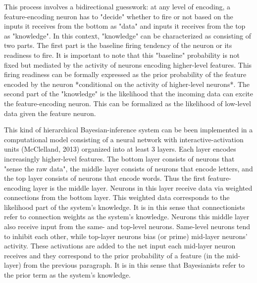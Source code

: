     This process involves a bidirectional guesswork: at any level of encoding, a feature-encoding neuron has to "decide" whether to fire or not based on the inputs it receives from the bottom as "data" and inputs it receives from the top as "knowledge". In this context, "knowledge" can be characterized as consisting of two parts. The first part is the baseline firing tendency of the neuron or its readiness to fire. It is important to note that this "baseline" probability is not fixed but mediated by the activity of neurons encoding higher-level features. This firing readiness can be formally expressed as the prior probability of the feature encoded by the neuron *conditional on the activity of higher-level neurons*. The second part of the "knowledge" is the likelihood that the incoming data can excite the feature-encoding neuron. This can be formalized as the likelihood of low-level data given the feature neuron. 

    This kind of hierarchical Bayesian-inference system can be been implemented in a computational model consisting of a neural network with interactive-activation units (McClelland, 2013) organized into at least 3 layers. Each layer encodes increasingly higher-level features. The bottom layer consists of neurons that "sense the raw data", the middle layer consists of neurons that encode letters, and the top layer consists of neurons that encode words. Thus the first feature-encoding layer is the middle layer. Neurons in this layer receive data via weighted connections from the bottom layer. This weighted data corresponds to the likelihood part of the system's knowledge. It is in this sense that connectionists refer to connection weights as the system's knowledge. Neurons this middle layer also receive input from the same- and top-level neurons. Same-level neurons tend to inhibit each other, while top-layer neurons bias (or prime) mid-layer neurons' activity. These activations are added to the net input each mid-layer neuron receives and they correspond to the prior probability of a feature (in the mid-layer) from the previous paragraph. It is in this sense that Bayesianists refer to the prior term as the system's knowledge.

